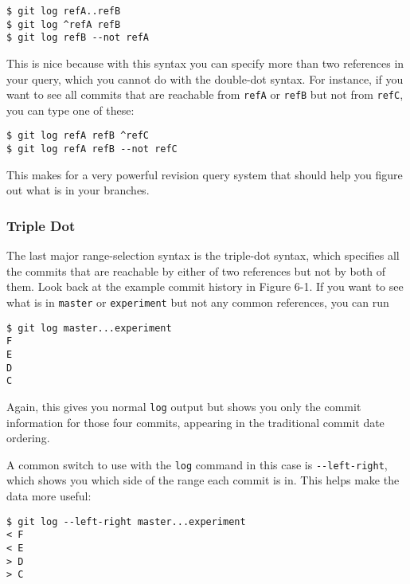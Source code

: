 \documentclass[a4paper]{book}
\begin{document}
\begin{shaded}\begin{verbatim}
$ git log refA..refB
$ git log ^refA refB
$ git log refB --not refA
\end{verbatim}\end{shaded}

This is nice because with this syntax you can specify more than two references in your query, which you cannot do with the double-dot syntax. For instance, if you want to see all commits that are reachable from \texttt{refA} or \texttt{refB} but not from \texttt{refC}, you can type one of these:

\begin{shaded}\begin{verbatim}
$ git log refA refB ^refC
$ git log refA refB --not refC
\end{verbatim}\end{shaded}

This makes for a very powerful revision query system that should help you figure out what is in your branches.

\subsubsection{Triple Dot}

The last major range-selection syntax is the triple-dot syntax, which specifies all the commits that are reachable by either of two references but not by both of them. Look back at the example commit history in Figure 6-1. If you want to see what is in \texttt{master} or \texttt{experiment} but not any common references, you can run

\begin{shaded}\begin{verbatim}
$ git log master...experiment
F
E
D
C
\end{verbatim}\end{shaded}

Again, this gives you normal \texttt{log} output but shows you only the commit information for those four commits, appearing in the traditional commit date ordering.

A common switch to use with the \texttt{log} command in this case is \texttt{-{}-left-right}, which shows you which side of the range each commit is in. This helps make the data more useful:

\begin{shaded}\begin{verbatim}
$ git log --left-right master...experiment
< F
< E
> D
> C
\end{verbatim}\end{shaded}
\end{document}
